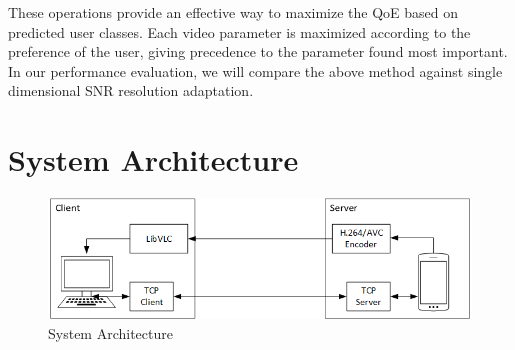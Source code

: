 These operations provide an effective way to maximize the QoE based on predicted user classes. Each video parameter is maximized according to the preference of the user, giving precedence to the parameter found most important. In our performance evaluation, we will compare the above method against single dimensional SNR resolution adaptation.

%
\section{System Architecture}
\label{sec:Architecture}
\begin{figure}[ht]
\centering
\includegraphics[width=0.7\linewidth]{images/SystemArchitecture.png}
\caption{System Architecture}
\label{fig:SystemArchitecture}
\end{figure}

